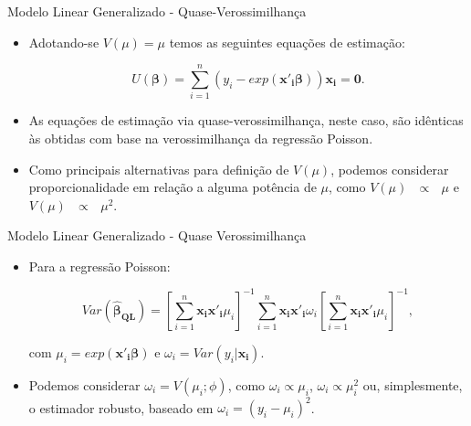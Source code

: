 \documentclass[10pt, aspectratio=169]{beamer}
\begin{document}




\begin{frame}{Modelo Linear Generalizado - Quase-Verossimilhança} 

\begin{itemize}




\item Adotando-se $V(\mu)=\mu$ temos as seguintes equações de estimação:



$$U(\boldsymbol{\beta}) =\sum_{i=1}^{n}(y_{i}-exp(\boldsymbol{x'_{i}\beta}))\boldsymbol{x_{i}=0}.$$


\vspace{0.5cm}

\item As equações de estimação via quase-verossimilhança, neste caso, são idênticas às obtidas com base na verossimilhança da regressão Poisson.


\item Como principais alternativas para definição de $V(\mu)$, podemos considerar proporcionalidade em relação a alguma potência de $\mu$, como $V(\mu) \text{ } \propto \text{ } \mu$ e $V(\mu)\text{ } \propto \text{ } \mu^2$.


\end{itemize}

\end{frame}






\begin{frame}{Modelo Linear Generalizado - Quase Verossimilhança} 

\begin{itemize}

\item Para a regressão Poisson:

$$
Var(\boldsymbol{\hat{\beta}_{QL}})=\left [ \sum_{i=1}^{n} \boldsymbol{x_{i}x'_{i}}\mu_{i} \right ]^{-1}
\sum_{i=1}^{n} \boldsymbol{x_{i}x'_{i}} \omega_{i} \left [ \sum_{i=1}^{n} \boldsymbol{x_{i}x'_{i}}\mu_{i} \right ]^{-1},
$$

com $\mu_{i}=exp({\boldsymbol{x'_{i}\beta}})$ e $\omega_{i}=Var(y_{i}|\boldsymbol{x_{i}})$.

\vspace{0.5cm}

\item Podemos considerar $\omega_i=V(\mu_i;\phi)$, como $\omega_i \propto \mu_i$, $\omega_i \propto \mu_i^2$ ou, simplesmente, o estimador robusto, baseado em $\omega_i=(y_i-\mu_i)^2$.

\end{itemize}

\end{frame}
\end{document}

